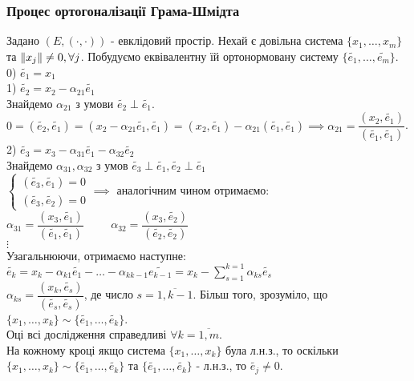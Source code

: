 \documentclass[a4paper, 10pt]{article}
\def\huge{\displaystyle}
\theoremstyle{theoremdd}
\theoremstyle{theoremdd}
\theoremstyle{theoremdd}
\theoremstyle{theoremdd}
\theoremstyle{theoremdd}
\theoremstyle{theoremdd}
\theoremstyle{theoremdd}
\theoremstyle{theoremdd}
\begin{document}
\subsubsection*{Процес ортогоналізації Грама-Шмідта}
Задано $(E,(\cdot,\cdot))$ - евклідовий простір. Нехай є довільна система $\{x_1,\dots,x_m\}$ та $\norm{x_j} \neq 0, \forall j$. Побудуємо еквівалентну їй ортонормовану систему $\{\tilde{e_1},\dots, \tilde{e_m} \}$.\\
0) $\tilde{e_1}=x_1$\\
1) $\tilde{e_2} = x_2 - \alpha_{21} \tilde{e_1}$\\
Знайдемо $\alpha_{21}$ з умови $\tilde{e_2} \perp \tilde{e_1}$.\\
$0 = (\tilde{e_2}, \tilde{e_1}) = (x_2-\alpha_{21}\tilde{e_1}, \tilde{e_1}) = (x_2, \tilde{e_1})-\alpha_{21} (\tilde{e_1},\tilde{e_1}) \implies \alpha_{21} = \dfrac{(x_2,\tilde{e_1})}{(\tilde{e_1},\tilde{e_1})}$.\\
2) $\tilde{e_3} = x_3 - \alpha_{31} \tilde{e_1} - \alpha_{32} \tilde{e_2}$\\
Знайдемо $\alpha_{31}, \alpha_{32}$ з умов $\tilde{e_3} \perp \tilde{e_1}, \tilde{e_2} \perp \tilde{e_1}$\\
$\begin{cases}
(\tilde{e_3}, \tilde{e_1}) = 0 \\
(\tilde{e_3}, \tilde{e_2}) = 0
\end{cases}
\implies$
аналогічним чином отримаємо:\\
$\alpha_{31} = \dfrac{(x_3, \tilde{e_1})}{(\tilde{e_1},\tilde{e_1})} \hspace{1cm} \alpha_{32} = \dfrac{(x_3, \tilde{e_2})}{(\tilde{e_2},\tilde{e_2})}$\\
$\vdots$\\
Узагальнюючи, отримаємо наступне:\\
$\tilde{e_k} = x_k - \alpha_{k1} \tilde{e_1} - \dots - \alpha_{k k-1} \tilde{e_{k-1}} = x_k - \huge\sum_{s=1}^{k=1} \alpha_{ks} \tilde{e_s}$\\
$\alpha_{ks} = \dfrac{(x_k, \tilde{e_s})}{(\tilde{e_s},\tilde{e_s})}$, де число $s = \overline{1,k-1}$. Більш того, зрозуміло, що $\{x_1,\dots,x_k\} \sim \{\tilde{e_1},\dots, \tilde{e_k}\}$.\\
Оці всі дослідження справедливі $\forall k = \overline{1,m}$.
\bigskip \\
На кожному кроці якщо система $\{x_1,\dots,x_k\}$ була л.н.з., то оскільки $\{x_1,\dots,x_k\} \sim \{\tilde{e_1},\dots,\tilde{e_k}\}$ та $\{\tilde{e_1},\dots,\tilde{e_k}\}$ - л.н.з., то $\tilde{e_j} \neq 0$.
\end{document}
